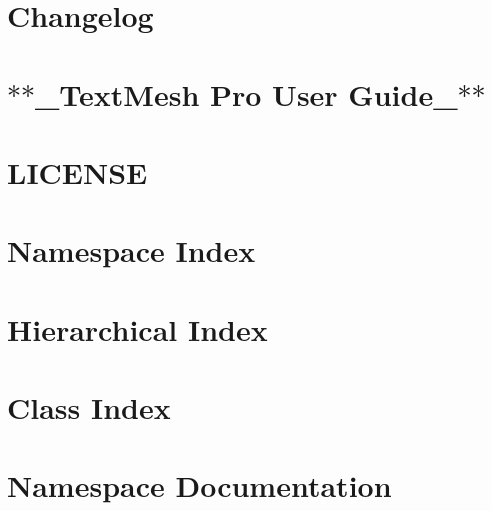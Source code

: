 \let\mypdfximage\pdfximage\def\pdfximage{\immediate\mypdfximage}\documentclass[twoside]{book}
\newcommand{\+}{\discretionary{\mbox{\scriptsize$\hookleftarrow$}}{}{}}
\begin{document}
\chapter{Changelog}
\label{autotoc_md98}

\chapter{$\ast$$\ast$\+\_\+\+Text\+Mesh Pro User Guide\+\_\+$\ast$$\ast$}
\label{autotoc_md121}

\chapter{L\+I\+C\+E\+N\+SE}
\label{md_Library_PackageCache_com_8unity_8textmeshpro_0d1_83_80_LICENSE}

\chapter{Namespace Index}

\chapter{Hierarchical Index}

\chapter{Class Index}

\chapter{Namespace Documentation}

















\end{document}
